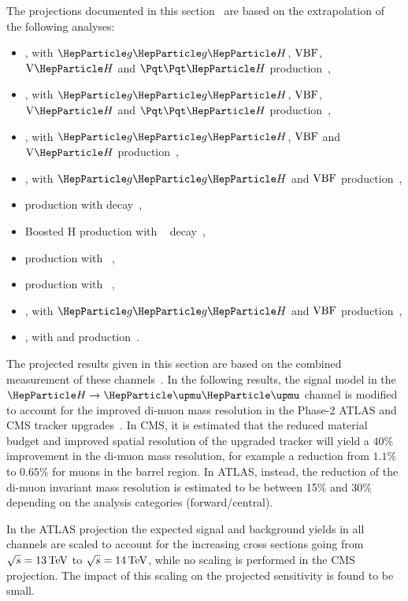 The projections documented in this section~\cite{CMS-PAS-FTR-18-011,ATL-PHYS-PUB-2018-054} are based on the extrapolation of the following analyses:

\begin{itemize}
	\item \hgg, with $\ggh$, $\mathrm{VBF}$, $\vh$ and $\tth$ production~\cite{Sirunyan:2018ouh,ATLAS-CONF-2018-028,Aaboud:2018urx},
	\item \hzzllll, with $\ggh$, $\mathrm{VBF}$, $\vh$ and $\tth$ production~\cite{HIG16041,ATLAS-CONF-2018-018},
	\item \hwwlnln, with $\ggh$, $\mathrm{VBF}$ and $\vh$ production~\cite{HIG-16-042,Aaboud:2018jqu},
	\item \htt, with $\ggh$ and $\mathrm{VBF}$ production~\cite{HIG16043,ATLAS-CONF-2018-021},
	\item \vh production with \hbb decay~\cite{HIG16044,Aaboud:2018zhk},
	\item Boosted H production with \hbb~ decay~\cite{HIG17010},
	\item \tth production with \hlep~\cite{Sirunyan:2018shy,Aaboud:2017jvq},
	\item \tth production with \hbb~\cite{bib:hig-17-026,Sirunyan:2018ygk,Aaboud:2017rss},
	\item \hmm, with $\ggh$ and $\mathrm{VBF}$ production~\cite{HIG-17-019,ATLAS-CONF-2018-026},
	\item \hzg, with \ggh and \vbf production~\cite{Aaboud:2017uhw}.
\end{itemize}

The projected results given in this section are based on the combined measurement of these channels~\cite{Sirunyan:2018koj,ATLAS-CONF-2018-031}. In the following results, the signal model in the $\hmm$ channel is modified to account for the improved di-muon mass resolution in the Phase-2 ATLAS and CMS tracker upgrades~\cite{Klein:2017nke,Collaboration:2285585}. In CMS, it is estimated that the reduced material budget and improved spatial resolution of the upgraded tracker will yield a $40\%$ improvement in the di-muon mass resolution, for example a reduction from $1.1\%$ to $0.65\%$ for muons in the barrel region. In ATLAS, instead, the reduction of the di-muon invariant mass resolution is estimated to be between 15\% and 30\% depending on the analysis categories (forward/central).

In the ATLAS projection the expected signal and background yields in all channels are scaled to account for the increasing cross sections going from $\sqrt{s}=13\,\text{Te\hspace{-.08em}V}$ to $\sqrt{s}=14\,\text{Te\hspace{-.08em}V}$, while no scaling is performed in the CMS projection. The impact of this scaling on the projected sensitivity is found to be small.

